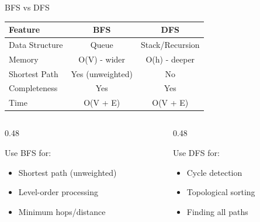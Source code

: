 \documentclass[aspectratio=169,xcolor=dvipsnames]{beamer}
\begin{document}
\begin{frame}{BFS vs DFS}
  \begin{table}
    \centering
    \begin{tabular}{l|c|c}
      \toprule
      \textbf{Feature} & \textbf{BFS} & \textbf{DFS} \\
      \midrule
      Data Structure & Queue & Stack/Recursion \\
      Memory & O(V) - wider & O(h) - deeper \\
      Shortest Path & Yes (unweighted) & No \\
      Completeness & Yes & Yes \\
      Time & O(V + E) & O(V + E) \\
      \bottomrule
    \end{tabular}
  \end{table}

  \vspace{0.3cm}

  \begin{columns}
    \begin{column}{0.48\textwidth}
      \begin{block}{Use BFS for:}
        \begin{itemize}
          \item Shortest path (unweighted)
          \item Level-order processing
          \item Minimum hops/distance
        \end{itemize}
      \end{block}
    \end{column}
    \begin{column}{0.48\textwidth}
      \begin{block}{Use DFS for:}
        \begin{itemize}
          \item Cycle detection
          \item Topological sorting
          \item Finding all paths
        \end{itemize}
      \end{block}
    \end{column}
  \end{columns}
\end{frame}

\end{document}
